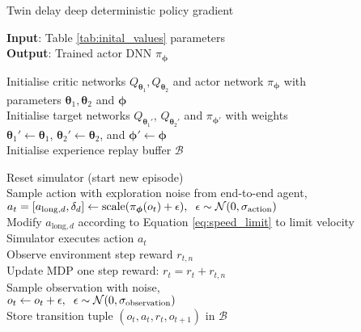 \begin{algorithm}[hbt!]
\caption{Twin delay deep deterministic policy gradient}\label{alg:td3_mod}
\nonl\textbf{Input}: Table \ref{tab:inital_values} parameters \\
\nonl\textbf{Output}: Trained actor DNN $\pi_{\bm{\phi}}$ \\

\vspace{0.5cm} 

Initialise critic networks $Q_{\bm{\theta}_1}, Q_{\bm{\theta}_2}$ and actor network $\pi_{\bm{\phi}}$ 
with \\
\nonl parameters $\bm{\theta}_1, \bm{\theta}_2$ and $\bm{\phi}$ \\
Initialise target networks $Q_{\bm{\theta}_1'}$, $Q_{\bm{\theta}_2'}$ and $\pi_{\bm{\phi}'}$ with weights \\
\nonl $\bm{\theta}_1' \leftarrow \bm{\theta}_1$, $\bm{\theta}_2' \leftarrow \bm{\theta}_2$, and $\bm{\phi}' \leftarrow \bm{\phi}$ \\
Initialise experience replay buffer $\mathcal{B}$ \\

\vspace{0.3cm}

{
    Reset simulator (start new episode) \\
    {
        Sample action with exploration noise from end-to-end agent, \\
        \nonl $a_{t} = \left[ a_{\text{long},d}, \delta_{d} \right] \leftarrow \text{scale}( \pi_{\bm{\phi}}(o_t) + \epsilon ), \hspace{0.2cm} \epsilon \sim \mathcal{N}(0, \sigma_{\text{action}})$ \\
            {   
                Modify $a_{\text{long},d}$ according to Equation \ref{eq:speed_limit} to limit velocity\\
                Simulator executes action $a_t$ \\
                Observe environment step reward $r_{t,n}$ \\  
                Update MDP one step reward: $r_t = r_t + r_{t,n}$ \\
                Sample observation with noise, \\
                \nonl $o_{t} \leftarrow  o_{t} + \epsilon, \hspace{0.2cm} \epsilon \sim \mathcal{N}(0, \sigma_{\text{observation}})$ \\
            }
        Store transition tuple $(o_t,a_t,r_t,o_{t+1})$ in $\mathcal{B}$ \\

}}
\end{algorithm}

